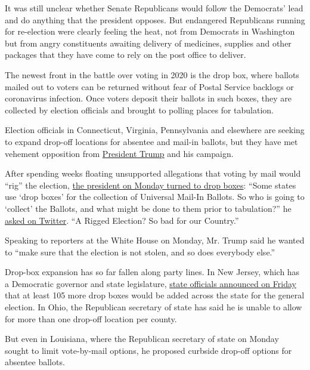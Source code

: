 It was still unclear whether Senate Republicans would follow the
Democrats' lead and do anything that the president opposes. But
endangered Republicans running for re-election were clearly feeling the
heat, not from Democrats in Washington but from angry constituents
awaiting delivery of medicines, supplies and other packages that they
have come to rely on the post office to deliver.

The newest front in the battle over voting in 2020 is the drop box,
where ballots mailed out to voters can be returned without fear of
Postal Service backlogs or coronavirus infection. Once voters deposit
their ballots in such boxes, they are collected by election officials
and brought to polling places for tabulation.

Election officials in Connecticut, Virginia, Pennsylvania and elsewhere
are seeking to expand drop-off locations for absentee and mail-in
ballots, but they have met vehement opposition from
\href{https://www.nytimes3xbfgragh.onion/interactive/2020/us/elections/donald-trump.html}{President
Trump} and his campaign.

After spending weeks floating unsupported allegations that voting by
mail would ``rig'' the election,
\href{https://twitter.com/realDonaldTrump/status/1295385113862090753}{the
president on Monday turned to drop boxes}: ``Some states use `drop
boxes' for the collection of Universal Mail-In Ballots. So who is going
to `collect' the Ballots, and what might be done to them prior to
tabulation?'' he
\href{https://twitter.com/realdonaldtrump/status/1295385113862090753}{asked
on Twitter}. ``A Rigged Election? So bad for our Country.''

Speaking to reporters at the White House on Monday, Mr. Trump said he
wanted to ``make sure that the election is not stolen, and so does
everybody else.''

Drop-box expansion has so far fallen along party lines. In New Jersey,
which has a Democratic governor and state legislature,
\href{https://www.nytimes3xbfgragh.onion/2020/08/14/nyregion/nj-vote-by-mail-election.html}{state
officials announced on Friday} that at least 105 more drop boxes would
be added across the state for the general election. In Ohio, the
Republican secretary of state has said he is unable to allow for more
than one drop-off location per county.

But even in Louisiana, where the Republican secretary of state on Monday
sought to limit vote-by-mail options, he proposed curbside drop-off
options for absentee ballots.

